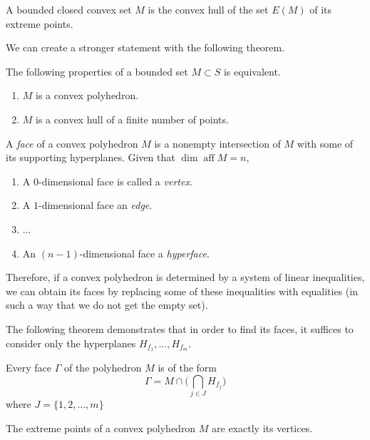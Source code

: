 \documentclass{article}
\DeclareMathOperator{\aff}{aff}
\begin{document}
    \begin{theorem}
    A bounded closed convex set $M$ is the convex hull of the set $E(M)$ of its extreme points. 
    \end{theorem}

    We can create a stronger statement with the following theorem. 

    \begin{theorem}
    The following properties of a bounded set $M \subset S$ is equivalent.
    \begin{enumerate}
        \item $M$ is a convex polyhedron. 
        \item $M$ is a convex hull of a finite number of points. 
    \end{enumerate}
    \end{theorem}

    \begin{definition}
    A \textit{face} of a convex polyhedron $M$ is a nonempty intersection of $M$ with some of its supporting hyperplanes. Given that $\dim \aff M = n$, 
    \begin{enumerate}
        \item A $0$-dimensional face is called a \textit{vertex}. 
        \item A $1$-dimensional face an \textit{edge}. 
        \item ...
        \item An $(n-1)$-dimensional face a \textit{hyperface}. 
    \end{enumerate}
    \end{definition}

    Therefore, if a convex polyhedron is determined by a system of linear inequalities, we can obtain its faces by replacing some of these inequalities with equalities (in such a way that we do not get the empty set). 

    The following theorem demonstrates that in order to find its faces, it suffices to consider only the hyperplanes $H_{f_1}, ..., H_{f_m}$. 

    \begin{theorem}
    Every face $\Gamma$ of the polyhedron $M$ is of the form
    \[\Gamma = M \cap \bigg( \bigcap_{j \in J} H_{f_j} \bigg)\]
    where $J = \{1, 2, ..., m\}$
    \end{theorem}

    \begin{proposition}
    The extreme points of a convex polyhedron $M$ are exactly its vertices. 
    \end{proposition}
\end{document}
